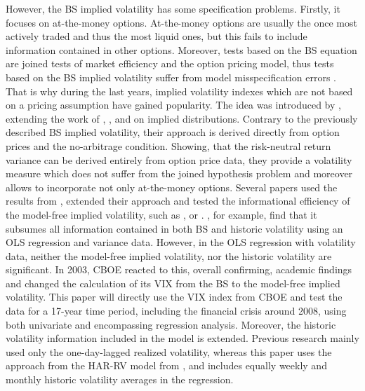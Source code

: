 However, the \ac{BS} implied volatility has some specification problems. Firstly, it focuses on at-the-money options. At-the-money options are usually the once most actively traded and thus the most liquid ones, but this fails to include information contained in other options. Moreover, tests based on the \ac{BS} equation are joined tests of market efficiency and the option pricing model, thus tests based on the \ac{BS} implied volatility suffer from model misspecification errors \parencite{jiang2003}. \\
That is why during the last years, implied volatility indexes which are not based on a pricing assumption have gained popularity. The idea was introduced by \textcite{britten2000}, extending the work of \textcite{derman1994}, \textcite{dupire1994}, \textcite{dupire1997} and \textcite{rubinstein1994} on implied distributions. Contrary to the previously described \ac{BS} implied volatility, their approach is derived directly from option prices and the no-arbitrage condition. Showing, that the risk-neutral return variance can be derived entirely from option price data, they provide a volatility measure which does not suffer from the joined hypothesis problem and moreover allows to incorporate not only at-the-money options.
Several papers used the results from \textcite{britten2000}, extended their approach and tested the informational efficiency of the model-free implied volatility, such as \textcite{bakanova2010}, \textcite{taylor2010} or \textcite{jiang2003}. \textcite{jiang2003}, for example, find that it subsumes all information contained in both \ac{BS} and historic volatility using an OLS regression and variance data. However, in the OLS regression with volatility data, neither the model-free implied volatility, nor the historic volatility are significant.
In 2003, \ac{CBOE} reacted to this, overall confirming, academic findings and changed the calculation of its \ac{VIX} from the \ac{BS} to the model-free implied volatility. This paper will directly use the \ac{VIX} index from \ac{CBOE} and test the data for a 17-year time period, including the financial crisis around 2008, using both univariate and encompassing regression analysis. Moreover, the historic volatility information included in the model is extended. Previous research mainly used only the one-day-lagged realized volatility, whereas this paper uses the approach from the HAR-RV model from \textcite{corsi2009}, and includes equally weekly and monthly historic volatility averages in the regression. 






